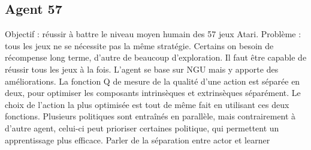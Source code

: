 \documentclass[a4paper,12pt]{report}
\begin{document}
\subsection{Agent 57}
Objectif : réussir à battre le niveau moyen humain des 57 jeux Atari. Problème : tous les jeux ne se nécessite pas la même stratégie. Certains on besoin de récompense long terme, d’autre de beaucoup d’exploration. Il faut être capable de réussir tous les jeux à la fois.
\newline
\newline L’agent se base sur NGU mais y apporte des améliorations. La fonction Q de mesure de la qualité d’une action est séparée en deux, pour optimiser les composants intrinsèques et extrinsèques séparément. Le choix de l’action la plus optimisée est tout de même fait en utilisant ces deux fonctions.
\newline
\newline Plusieurs politiques sont entraînés en parallèle, mais contrairement à d’autre agent, celui-ci peut prioriser certaines politique, qui permettent un apprentissage plus efficace.
\newline
\newline Parler de la séparation entre actor et learner
\end{document}
